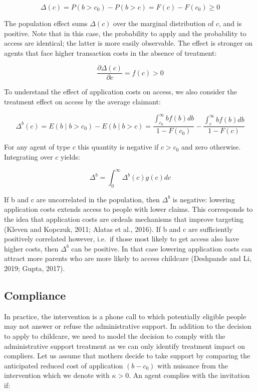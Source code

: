 \documentclass[
]{article}
\begin{document}
\[
\Delta(c)=P\left(b>c_0\right)-P(b>c)=F(c)-F\left(c_0\right) \geq 0
\]

The population effect sums \(\Delta(c)\) over the marginal distribution of \(c\), and is positive. Note that in this case, the probability to apply and the probability to access are identical; the latter is more easily observable. The effect is stronger on agents that face higher transaction costs in the absence of treatment:

\[
\frac{\partial \Delta(c)}{\partial c}=f(c)>0
\]

To understand the effect of application costs on access, we also consider the treatment effect on access by the average claimant:

\[
\Delta^b(c)=E\left(b \mid b>c_0\right)-E(b \mid b>c)=\frac{\int_{c_0}^{\infty} b f(b) d b}{1-F\left(c_0\right)}-\frac{\int_c^{\infty} b f(b) d b}{1-F(c)}
\]

For any agent of type \(c\) this quantity is negative if \(c>c_0\) and zero otherwise. Integrating over \(c\) yields:

\[
\Delta^b=\int_0^{\infty} \Delta^b(c) g(c) d c
\]

If b and c are uncorrelated in the population, then \(\Delta^b\) is negative: lowering application costs extends access to people with lower claims. This corresponds to the idea that application costs are ordeals mechanisms that improve targeting (Kleven and Kopczuk, 2011; Alatas et al., 2016). If b and c are sufficiently positively correlated however, i.e.~if those most likely to get access also have higher costs, then \(\Delta^b\) can be positive. In that case lowering application costs can attract more parents who are more likely to access childcare (Deshpande and Li, 2019; Gupta, 2017).

\subsection{Compliance}\label{compliance}

In practice, the intervention is a phone call to which potentially eligible people may not answer or refuse the administrative support. In addition to the decision to apply to childcare, we need to model the decision to comply with the administrative support treatment as we can only identify treatment impact on compliers. Let us assume that mothers decide to take support by comparing the anticipated reduced cost of application \(\left(b-c_0\right)\) with nuisance from the intervention which we denote with \(\kappa>0\). An agent complies with the invitation if:
\end{document}
